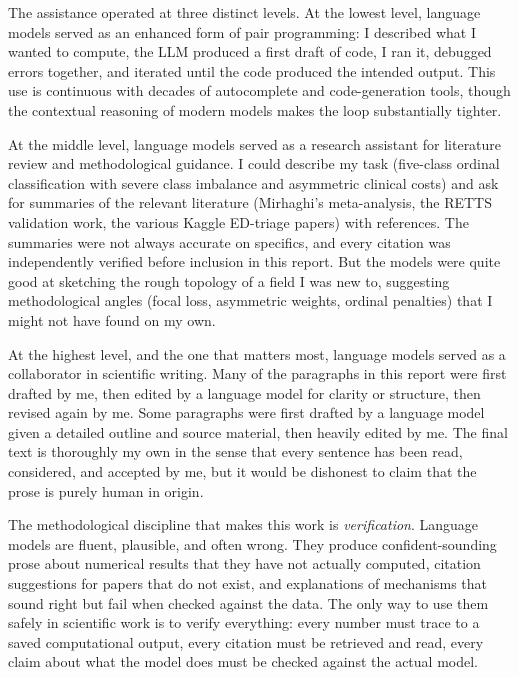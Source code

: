The assistance operated at three distinct levels. At the lowest level, language models served as an enhanced form of pair programming: I described what I wanted to compute, the LLM produced a first draft of code, I ran it, debugged errors together, and iterated until the code produced the intended output. This use is continuous with decades of autocomplete and code-generation tools, though the contextual reasoning of modern models makes the loop substantially tighter.

At the middle level, language models served as a research assistant for literature review and methodological guidance. I could describe my task (five-class ordinal classification with severe class imbalance and asymmetric clinical costs) and ask for summaries of the relevant literature (Mirhaghi's meta-analysis, the RETTS validation work, the various Kaggle ED-triage papers) with references. The summaries were not always accurate on specifics, and every citation was independently verified before inclusion in this report. But the models were quite good at sketching the rough topology of a field I was new to, suggesting methodological angles (focal loss, asymmetric weights, ordinal penalties) that I might not have found on my own.

At the highest level, and the one that matters most, language models served as a collaborator in scientific writing. Many of the paragraphs in this report were first drafted by me, then edited by a language model for clarity or structure, then revised again by me. Some paragraphs were first drafted by a language model given a detailed outline and source material, then heavily edited by me. The final text is thoroughly my own in the sense that every sentence has been read, considered, and accepted by me, but it would be dishonest to claim that the prose is purely human in origin.

The methodological discipline that makes this work is \emph{verification}. Language models are fluent, plausible, and often wrong. They produce confident-sounding prose about numerical results that they have not actually computed, citation suggestions for papers that do not exist, and explanations of mechanisms that sound right but fail when checked against the data. The only way to use them safely in scientific work is to verify everything: every number must trace to a saved computational output, every citation must be retrieved and read, every claim about what the model does must be checked against the actual model.


